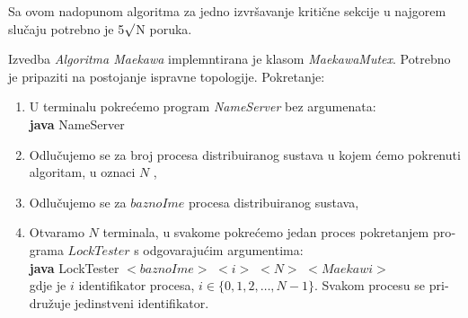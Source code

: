 \documentclass[12pt]{rectors}
\begin{document}
\begin{otherlanguage}{croatian}
Sa ovom nadopunom algoritma za jedno izvršavanje kritične sekcije u najgorem slučaju potrebno je 5$\surd$N poruka.

Izvedba \textit{Algoritma Maekawa} implemntirana je klasom \textit{MaekawaMutex}.
Potrebno je pripaziti na postojanje ispravne topologije.
Pokretanje: %
\begin{enumerate}
	\item U terminalu pokrećemo program \textit{NameServer} bez argumenata:\\
	\textbf{java} NameServer
	\item Odlučujemo se za broj procesa distribuiranog sustava u kojem ćemo pokrenuti 
	algoritam, u oznaci $N$ ,
	\item Odlučujemo se za $baznoIme$ procesa distribuiranog sustava,
	\item Otvaramo $N$ terminala, u svakome pokrećemo jedan proces pokretanjem programa
	$LockTester$ s odgovarajućim argumentima:\\
	\textbf{java} LockTester $<baznoIme>$ $<i>$ $<N>$ $<Maekawi>$
	\vspace{0.2cm}
	\\gdje je $i$ identifikator procesa, $i \in \{ 0,1,2,\hdots,N-1 \}$. 
	Svakom procesu se pridružuje jedinstveni identifikator.
\end{enumerate}


\renewcommand{\refname}{}
\nocite{*}


\end{otherlanguage}
\end{document}
